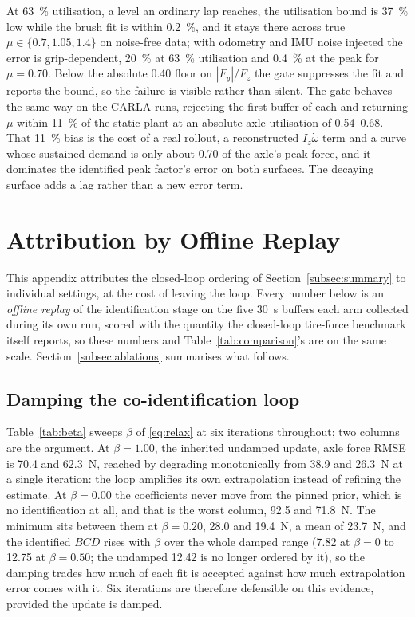 At \SI{63}{\percent} utilisation, a level an ordinary lap reaches, the
utilisation bound is \SI{37}{\percent} low while the brush fit is within
\SI{0.2}{\percent}, and it stays there across true $\mu\in\{0.7,1.05,1.4\}$ on
noise-free data; with odometry and IMU noise injected the error is
grip-dependent, \SI{20}{\percent} at \SI{63}{\percent} utilisation and
\SI{0.4}{\percent} at the peak for $\mu=0.70$. Below the absolute \num{0.40}
floor on $|F_{y}|/F_{z}$ the gate suppresses the fit and reports the bound, so
the failure is visible rather than silent. The gate behaves the same way on the
CARLA runs, rejecting the first buffer of each and returning $\mu$ within
\SI{11}{\percent} of the static plant at an absolute axle utilisation of
\numrange{0.54}{0.68}. That \SI{11}{\percent} bias is the cost of a real
rollout, a reconstructed $I_{z}\dot\omega$ term and a curve whose sustained
demand is only about \num{0.70} of the axle's peak force, and it dominates the
identified peak factor's error on both surfaces. The decaying surface adds a
lag rather than a new error term.

\section{Attribution by Offline Replay}
\label{sec:ablations}

This appendix attributes the closed-loop ordering of
Section~\ref{subsec:summary} to individual settings, at the cost of leaving the
loop. Every number below is an \emph{offline replay} of the identification
stage on the five \SI{30}{\second} buffers each arm collected during its own
run, scored with the quantity the closed-loop tire-force benchmark itself
reports, so these numbers and Table~\ref{tab:comparison}'s are on the same
scale. Section~\ref{subsec:ablations} summarises what follows.

\subsection*{Damping the co-identification loop}
Table~\ref{tab:beta} sweeps $\beta$ of \eqref{eq:relax} at six iterations
throughout; two columns are the argument. At $\beta=\num{1.00}$, the inherited
undamped update, axle force RMSE is \num{70.4} and \SI{62.3}{\newton}, reached
by degrading monotonically from \num{38.9} and \SI{26.3}{\newton} at a single
iteration: the loop amplifies its own extrapolation instead of refining the
estimate. At $\beta=\num{0.00}$ the coefficients never move from the pinned
prior, which is no identification at all, and that is the worst column,
\num{92.5} and \SI{71.8}{\newton}. The minimum sits between them at
$\beta=\num{0.20}$, \num{28.0} and \SI{19.4}{\newton}, a mean of
\SI{23.7}{\newton}, and the identified $BCD$ rises with $\beta$ over the whole
damped range (\num{7.82} at $\beta=0$ to \num{12.75} at $\beta=\num{0.50}$; the
undamped \num{12.42} is no longer ordered by it), so the damping trades how
much of each fit is accepted against how much extrapolation error comes with
it. Six iterations are therefore defensible on this evidence, provided the
update is damped.

